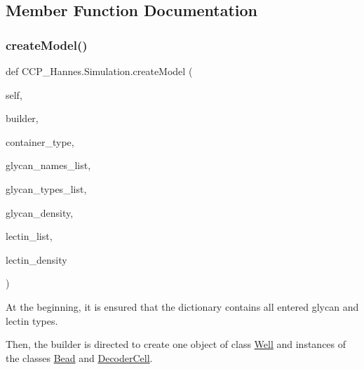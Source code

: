\subsection{Member Function Documentation}
\mbox{\label{class_c_c_p___hannes_1_1_simulation_a9c38e62adf0444d0e97d068f2ee0daad}} 
\subsubsection{\texorpdfstring{create\+Model()}{createModel()}}
{\footnotesize\ttfamily def C\+C\+P\+\_\+\+Hannes.\+Simulation.\+create\+Model (\begin{DoxyParamCaption}\item[{}]{self,  }\item[{}]{builder,  }\item[{}]{container\+\_\+type,  }\item[{}]{glycan\+\_\+names\+\_\+list,  }\item[{}]{glycan\+\_\+types\+\_\+list,  }\item[{}]{glycan\+\_\+density,  }\item[{}]{lectin\+\_\+list,  }\item[{}]{lectin\+\_\+density }\end{DoxyParamCaption})}



At the beginning, it is ensured that the dictionary contains all entered glycan and lectin types. 

Then, the builder is directed to create one object of class \mbox{\hyperlink{class_c_c_p___hannes_1_1_well}{Well}} and instances of the classes \mbox{\hyperlink{class_c_c_p___hannes_1_1_bead}{Bead}} and \mbox{\hyperlink{class_c_c_p___hannes_1_1_decoder_cell}{Decoder\+Cell}}.



